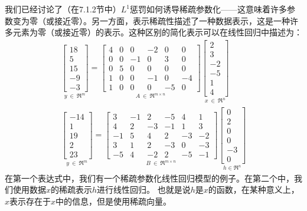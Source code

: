 我们已经讨论了（在7.1.2节中）$L^1$惩罚如何诱导稀疏参数化——这意味着许多参数变为零（或接近零）。另一方面，表示稀疏性描述了一种数据表示，这是一种许多元素为零（或接近零）的表示。这种区别的简化表示可以在线性回归中描述为：
$$
\begin{aligned}
\underset{y ~\in~ \Re^m}{
\begin{bmatrix}
18 \\ 5 \\ 15 \\ -9 \\ -3
\end{bmatrix}} =
\underset{A ~\in~ \Re^{m \times n}}{
\begin{bmatrix}
4 & 0 & 0 & -2 & 0 & 0 \\
0 & 0 & -1 & 0 & 3 & 0 \\
0 & 5 & 0 & 0 & 0 & 0 \\
1 & 0 & 0 & -1 & 0 & -4 \\
1 & 0 & 0 & 0 & -5 & 0
\end{bmatrix}}
\underset{x ~\in~ \Re^n}{
\begin{bmatrix}
2 \\ 3\\ -2\\ -5 \\ 1 \\ 4
\end{bmatrix} }\\
\underset{y ~\in~ \Re^m}{
\begin{bmatrix}
-14 \\ 1 \\ 19 \\ 2 \\ 23
\end{bmatrix}} =
\underset{B ~\in~ \Re^{m \times n}}{
\begin{bmatrix}
3 & -1 & 2 & -5 & 4 & 1 \\
4 & 2 & -3 & -1 & 1 & 3 \\
-1 & 5 & 4 & 2 & -3 & -2 \\
3 & 1 & 2 & -3 & 0 & -3 \\
-5 & 4 & -2 & 2 & -5 & -1
\end{bmatrix}}
\underset{h \in \Re^n}{
\begin{bmatrix}
0 \\ 2 \\ 0 \\ 0 \\ -3 \\ 0
\end{bmatrix} }
\end{aligned}
$$
在第一个表达式中，我们有一个稀疏参数化线性回归模型的例子。在第二个中，我们使用数据$x$的稀疏表示$h$进行线性回归。 也就是说$h$是$x$的函数，在某种意义上，$x$表示存在于$x$中的信息，但是使用稀疏向量。


